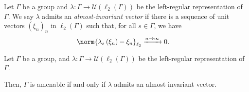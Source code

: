 \begin{definition}\label{def:almost_invariant_vector}
  Let $\Gamma$ be a group and $\lambda\colon \Gamma\rightarrow \mathcal{U}\left( \ell_2\left( \Gamma \right) \right)$ be the left-regular representation of $\Gamma$. We say $\lambda$ admits an \textit{almost-invariant vector} if there is a sequence of unit vectors $\left( \xi_n \right)_n$ in $\ell_2\left( \Gamma \right)$ such that, for all $s\in\Gamma$, we have
  \begin{align*}
    \norm{\lambda_s\left( \xi_n \right) - \xi_n}_{\ell_2} &\xrightarrow{n\rightarrow\infty} 0.
  \end{align*}
\end{definition}
\begin{theorem}\label{thm:almost_invariant_vector}
  Let $\Gamma$ be a group, and $\lambda\colon \Gamma\rightarrow \mathcal{U}\left( \ell_2\left( \Gamma \right) \right)$ be the left-regular representation of $\Gamma$.\newline

  Then, $\Gamma$ is amenable if and only if $\lambda$ admits an almost-invariant vector.
\end{theorem}
